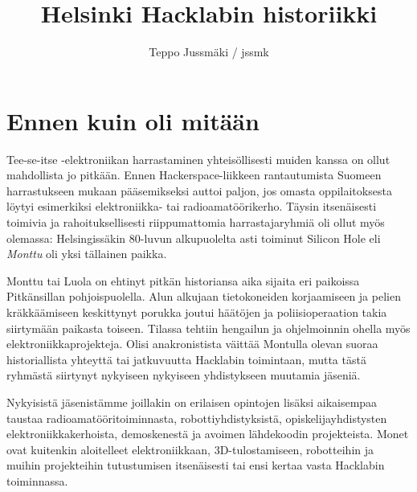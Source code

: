\documentclass[a4paper]{memoir}
\title{Helsinki Hacklabin historiikki}
\author{Teppo Jussmäki / jssmk}
\newlength{\distance}
\begin{document}



\setsansfont{Tahoma}
 




\section*{Ennen kuin oli mitään}

Tee-se-itse -elektroniikan harrastaminen yhteisöllisesti muiden kanssa on ollut mahdollista jo pitkään. Ennen Hackerspace-liikkeen rantautumista Suomeen harrastukseen mukaan pääsemikseksi auttoi paljon, jos omasta oppilaitoksesta löytyi esimerkiksi elektroniikka- tai radioamatöörikerho. Täysin itsenäisesti toimivia ja rahoituksellisesti riippumattomia harrastajaryhmiä oli ollut myös olemassa: Helsingissäkin 80-luvun alkupuolelta asti toiminut Silicon Hole eli \textit{Monttu} oli yksi tällainen paikka.

Monttu tai Luola on ehtinyt pitkän historiansa aika sijaita eri paikoissa Pitkänsillan pohjoispuolella. Alun alkujaan tietokoneiden korjaamiseen ja pelien kräkkäämiseen keskittynyt porukka joutui häätöjen ja poliisioperaation takia siirtymään paikasta toiseen. Tilassa tehtiin hengailun ja ohjelmoinnin ohella myös elektroniikkaprojekteja. Olisi anakronistista väittää Montulla olevan suoraa historiallista yhteyttä tai jatkuvuutta Hacklabin toimintaan, mutta tästä ryhmästä siirtynyt nykyiseen nykyiseen yhdistykseen muutamia jäseniä.

Nykyisistä jäsenistämme joillakin on erilaisen opintojen lisäksi aikaisempaa taustaa radioamatööritoiminnasta, robottiyhdistyksistä, opiskelijayhdistysten elektroniikkakerhoista, demoskenestä ja avoimen lähdekoodin projekteista. Monet ovat kuitenkin aloitelleet elektroniikkaan, 3D-tulostamiseen, robotteihin ja muihin projekteihin tutustumisen itsenäisesti tai ensi kertaa vasta Hacklabin toiminnassa.
\end{document}
